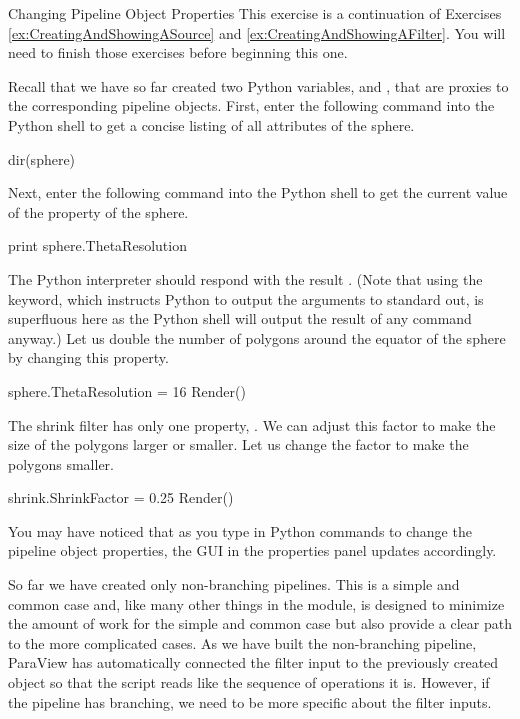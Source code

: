 \begin{exercise}{Changing Pipeline Object Properties}
  \label{ex:ChangingPipelineObjectProperties}%
  This exercise is a continuation of Exercises
  \ref{ex:CreatingAndShowingASource} and
  \ref{ex:CreatingAndShowingAFilter}.  You will need to finish those
  exercises before beginning this one.

  Recall that we have so far created two Python variables, 
  and , that are proxies to the corresponding pipeline
  objects.  First, enter the following command into the Python shell to get
  a concise listing of all attributes of the sphere.

  \begin{python}
dir(sphere)
  \end{python}

  Next, enter the following command into the Python shell to get
  the current value of the  property of the sphere.

  \begin{python}
print sphere.ThetaResolution
  \end{python}

  The Python interpreter should respond with the result .  (Note
  that using the  keyword, which instructs Python to output
  the arguments to standard out, is superfluous here as the Python shell
  will output the result of any command anyway.)  Let us double the number
  of polygons around the equator of the sphere by changing this property.

  \begin{python}
sphere.ThetaResolution = 16
Render()
  \end{python}

  The shrink filter has only one property, .  We can
  adjust this factor to make the size of the polygons larger or smaller.
  Let us change the factor to make the polygons smaller.

  \begin{python}
shrink.ShrinkFactor = 0.25
Render()
  \end{python}

  You may have noticed that as you type in Python commands to change the
  pipeline object properties, the GUI in the properties panel updates
  accordingly.
\end{exercise}

So far we have created only non-branching pipelines.  This is a simple and
common case and, like many other things in the 
module, is designed to minimize the amount of work for the simple and
common case but also provide a clear path to the more complicated cases.
As we have built the non-branching pipeline, ParaView has automatically
connected the filter input to the previously created object so that the
script reads like the sequence of operations it is.  However, if the
pipeline has branching, we need to be more specific about the filter
inputs.

